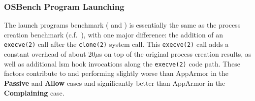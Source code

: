 


\subsubsection{OSBench Program Launching}

The launch programs benchmark ( and ) is essentially the
same as the process creation benchmark (c.f.~), with one
major difference: the addition of an \texttt{execve(2)} call after the \texttt{clone(2)}
system call. This \texttt{execve(2)} call adds a constant overhead of about 20$\mu$s on
top of the original process creation results, as well as additional \gls{lsm} hook
invocations along the \texttt{execve(2)} code path. These factors contribute to \bpfbox{}
and \bpfcontain{} performing slightly worse than AppArmor in the \textbf{Passive} and
\textbf{Allow} cases and significantly better than AppArmor in the \textbf{Complaining}
case.

